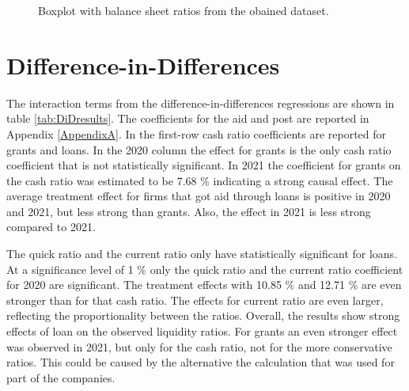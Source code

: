 \begin{figure}
\centering
{}%

\decoRule
\caption[Balance sheet ratios]{Boxplot with balance sheet ratios from the obained dataset.}
\label{fig:Ratios}
\end{figure}



\section{Difference-in-Differences}

The interaction terms from the difference-in-differences regressions are shown in table \ref{tab:DiDresults}. The coefficients for the aid and post are reported in Appendix \ref{AppendixA}. In the first-row cash ratio coefficients are reported for grants and loans. In the 2020 column the effect for grants is the only cash ratio coefficient that is not statistically significant. In 2021 the coefficient for grants on the cash ratio was estimated to be 7.68 \% indicating a strong causal effect. The average treatment effect for firms that got aid through loans is positive in 2020 and 2021, but less strong than grants. Also, the effect in 2021 is less strong compared to 2021.

The quick ratio and the current ratio only have statistically significant for loans. At a significance level of 1 \% only the quick ratio and the current ratio coefficient for 2020 are significant. The treatment effects with 10.85 \% and 12.71 \% are even stronger than for that cash ratio. The effects for current ratio are even larger, reflecting the proportionality between the ratios. Overall, the results show strong effects of loan on the observed liquidity ratios. For grants an even stronger effect was observed in 2021, but only for the cash ratio, not for the more conservative ratios. This could be caused by the alternative the calculation that was used for part of the companies. 

